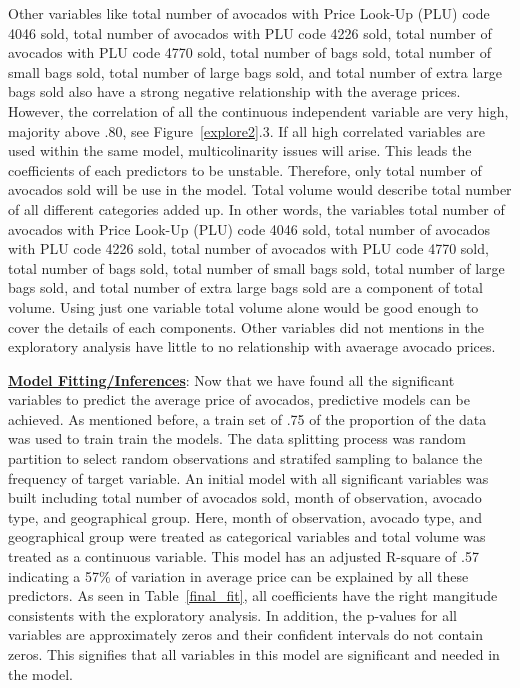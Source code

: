 \documentclass[11pt]{article}\usepackage[]{graphicx}\usepackage[]{color}
\begin{document}
\noindent Other variables like total number of avocados with Price Look-Up (PLU) code 4046 sold, total number of avocados with PLU code 4226 sold, total number of avocados with PLU code 4770 sold, total number of bags sold, total number of small bags sold, total number of large bags sold, and total number of extra large bags sold also have a strong negative relationship with the average prices. However, the correlation of all the continuous independent variable are very high, majority above .80, see Figure~\ref{explore2}.3. If all high correlated variables are used within the same model, multicolinarity issues will arise. This leads the coefficients of each predictors to be unstable. Therefore, only total number of avocados sold will be use in the model. Total volume would describe total number of all different categories added up. In other words, the variables total number of avocados with Price Look-Up (PLU) code 4046 sold, total number of avocados with PLU code 4226 sold, total number of avocados with PLU code 4770 sold, total number of bags sold, total number of small bags sold, total number of large bags sold, and total number of extra large bags sold are a component of total volume. Using just one variable total volume alone would be good enough to cover the details of each components. Other variables did not mentions in the exploratory analysis have little to no relationship with avaerage avocado prices.  
\hfill \break




\noindent\textbf{\underline{Model Fitting/Inferences}}: Now that we have found all the significant variables to predict the average price of avocados, predictive models can be achieved. As mentioned before, a train set of .75 of the proportion of the data was used to train train the models. The data splitting process was random partition to select random observations and stratifed sampling to balance the frequency of target variable. An initial model with all significant variables was built including total number of avocados sold, month of observation, avocado type, and geographical group. Here, month of observation, avocado type, and geographical group were treated as categorical variables and total volume was treated as a continuous variable. This model has an adjusted R-square of .57 indicating a 57\% of variation in average price can be explained by all these predictors. As seen in Table~\ref{final_fit}, all coefficients have the right mangitude consistents with the exploratory analysis. In addition, the p-values for all variables are approximately zeros and their confident intervals do not contain zeros. This signifies that all variables in this model are significant and needed in the model.    
\end{document}
